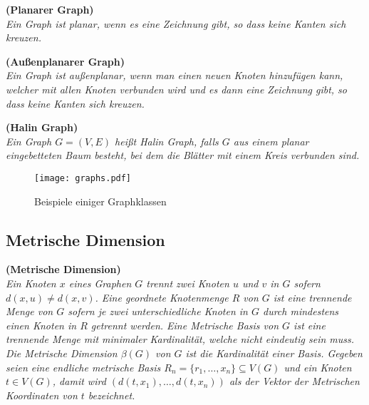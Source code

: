 \begin{defi}{\textbf{(Planarer Graph)}}\\
\emph{Ein Graph ist planar, wenn es eine Zeichnung gibt, so dass keine Kanten sich kreuzen.} \end{defi}


\begin{defi}{\textbf{(Außenplanarer Graph)}}\\
\emph{Ein Graph ist außenplanar, wenn man einen neuen Knoten hinzufügen kann, welcher mit allen Knoten verbunden wird und es dann eine Zeichnung gibt, so dass keine Kanten sich kreuzen.} 
\end{defi}


\begin{defi}{\textbf{(Halin Graph)}}\\
\emph{Ein Graph $G = (V, E)$ heißt Halin Graph, falls $G$ aus einem planar eingebetteten Baum besteht, bei dem die Blätter mit einem Kreis verbunden sind.} 
\end{defi}
\begin{figure}[h!]
		\centering 		 
   \texttt{[image: graphs.pdf]}
	\caption{Beispiele einiger Graphklassen}
  	 \end{figure}
\clearpage
\subsection{Metrische Dimension}
\label{MDT}
\begin{defi}{\textbf{(Metrische Dimension)}}\\
\emph{Ein Knoten $x$ eines Graphen $G$ trennt zwei Knoten $u$ und $v$ in $G$ sofern $d(x, u) \neq d(x, v)$. Eine geordnete Knotenmenge $R$ von $G$ ist eine \emph{trennende Menge} von $G$ sofern je zwei unterschiedliche Knoten in $G$ durch mindestens einen Knoten in $R$ getrennt werden. Eine \emph{Metrische Basis} von $G$ ist eine trennende Menge mit minimaler Kardinalität, welche nicht eindeutig sein muss. Die Metrische Dimension $\beta(G)$ von $G$ ist die Kardinalität einer Basis\cite{?}. Gegeben seien eine endliche metrische Basis $R_n = \{r_1 , \ldots , x_n \} \subseteq V (G)$ und ein Knoten $t \in V (G)$, damit wird $(d(t, x_1 ), \ldots , d(t, x_n ))$ als der Vektor der \emph{Metrischen Koordinaten} von $t$ bezeichnet.} 
\end{defi}

